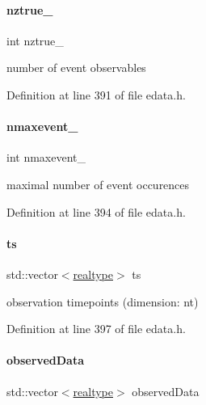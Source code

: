 \paragraph{\texorpdfstring{nztrue\_}{nztrue\_}}
{\footnotesize\ttfamily int nztrue\+\_\+\hspace{0.3cm}{\ttfamily [protected]}}

number of event observables 

Definition at line 391 of file edata.\+h.

\mbox{\label{classamici_1_1_exp_data_af1bb7f9e32c45f8f3c34c9c4a7e5b1ac}} 
\paragraph{\texorpdfstring{nmaxevent\_}{nmaxevent\_}}
{\footnotesize\ttfamily int nmaxevent\+\_\+\hspace{0.3cm}{\ttfamily [protected]}}

maximal number of event occurences 

Definition at line 394 of file edata.\+h.

\mbox{\label{classamici_1_1_exp_data_aa7014a80e7b102f85a10e3b9a480e8e5}} 
\paragraph{\texorpdfstring{ts}{ts}}
{\footnotesize\ttfamily std\+::vector$<$\mbox{\hyperlink{namespaceamici_a1bdce28051d6a53868f7ccbf5f2c14a3}{realtype}}$>$ ts\hspace{0.3cm}{\ttfamily [protected]}}

observation timepoints (dimension\+: nt) 

Definition at line 397 of file edata.\+h.

\mbox{\label{classamici_1_1_exp_data_a6acedf749a3c5e4c4dcbc822f58a565d}} 
\paragraph{\texorpdfstring{observedData}{observedData}}
{\footnotesize\ttfamily std\+::vector$<$\mbox{\hyperlink{namespaceamici_a1bdce28051d6a53868f7ccbf5f2c14a3}{realtype}}$>$ observed\+Data\hspace{0.3cm}{\ttfamily [protected]}}

